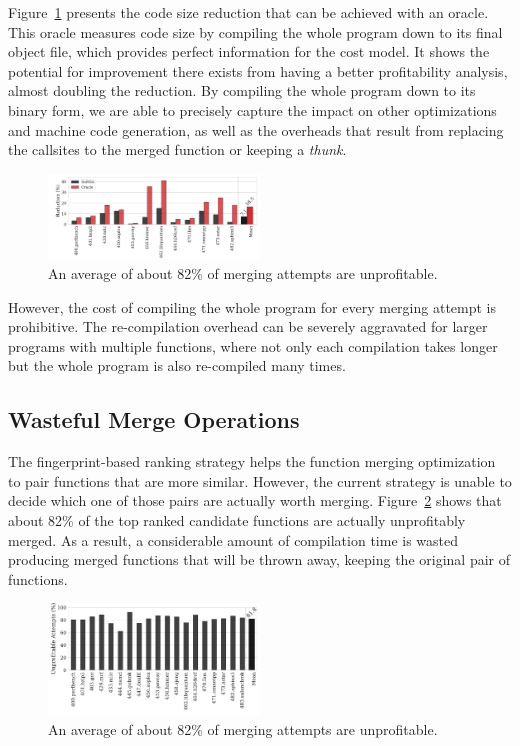 Figure~\ref{fig:oracle-reduction} presents the code size reduction that can be achieved with an oracle.
This oracle measures code size by compiling the whole program down to its final object file, which provides perfect information for the cost model.
It shows the potential for improvement there exists from having a better profitability analysis, almost doubling the reduction.
By compiling the whole program down to its binary form, we are able to precisely capture the impact on other optimizations and machine code generation, as well as the overheads that result from replacing the callsites to the merged function or keeping a \textit{thunk}.

\begin{figure}[h]
  \centering
  \includegraphics[width=0.5\textwidth]{figs/motivation-oracle-reduction.pdf}
  \vspace{-2.5em}
  \caption{An average of about 82\% of merging attempts are unprofitable.}
  \label{fig:oracle-reduction}
\end{figure}

However, the cost of compiling the whole program for every merging attempt is prohibitive.
The re-compilation overhead can be severely aggravated for larger programs with multiple functions, where not only each compilation takes longer but the whole program is also re-compiled many times.

\subsection{Wasteful Merge Operations}

The fingerprint-based ranking strategy helps the function merging optimization to pair functions that are more similar.
However, the current strategy is unable to decide which one of those pairs are actually worth merging.
Figure~\ref{fig:unprofitable-attempts} shows that about 82\% of the top ranked candidate functions are actually unprofitably merged.
As a result, a considerable amount of compilation time is wasted producing merged functions that will be thrown away, keeping the original pair of functions.

\begin{figure}[h]
  \centering
  \includegraphics[width=0.5\textwidth]{figs/unprofitable-attempts.pdf}
  \vspace{-2.5em}
  \caption{An average of about 82\% of merging attempts are unprofitable.}
  \label{fig:unprofitable-attempts}
\end{figure}

